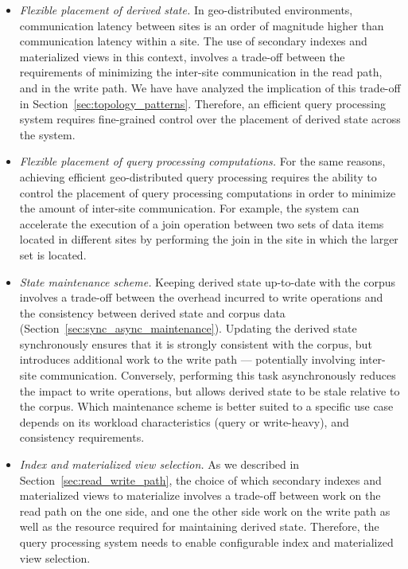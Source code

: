 \begin{itemize}
  \item \textit{Flexible placement of derived state.}
  In geo-distributed environments, communication latency between sites is an order of magnitude higher than
  communication latency within a site.
  The use of secondary indexes and materialized views in this context, involves a trade-off between the requirements
  of minimizing the inter-site communication in the read path, and in the write path.
  We have have analyzed the implication of this trade-off in Section~\ref{sec:topology_patterns}.
  Therefore, an efficient query processing system requires fine-grained control over the placement of derived state
  across the system.

  \item \textit{Flexible placement of query processing computations.}
  For the same reasons, achieving efficient geo-distributed query processing requires the ability to control the
  placement of query processing computations in order to minimize the amount of inter-site communication.
  For example, the system can accelerate the execution of a join operation between two sets of data items located in different sites
  by performing the join in the site in which the larger set is located.

  \item \textit{State maintenance scheme.}
  Keeping derived state up-to-date with the corpus involves a trade-off between
  the overhead incurred to write operations and the consistency between derived state and corpus data (Section~\ref{sec:sync_async_maintenance}).
  Updating the derived state synchronously
  ensures that it is strongly consistent with the
  corpus, but introduces additional work to the write path --- potentially involving inter-site communication.
  Conversely, performing this task asynchronously reduces the impact to write operations,
  but allows derived state to be stale relative to the corpus.
  Which maintenance scheme is better suited to a specific use case depends on its workload characteristics (query or write-heavy), and consistency requirements.

  \item \textit{Index and materialized view selection.}
  As we described in Section~\ref{sec:read_write_path}, the choice of which secondary indexes and materialized views to
  materialize involves a trade-off between work on the read path on the one side,
  and one the other side work on the write path as well as the resource required for maintaining derived state.
  Therefore, the query processing system needs to enable configurable index and materialized view selection.


\end{itemize}
